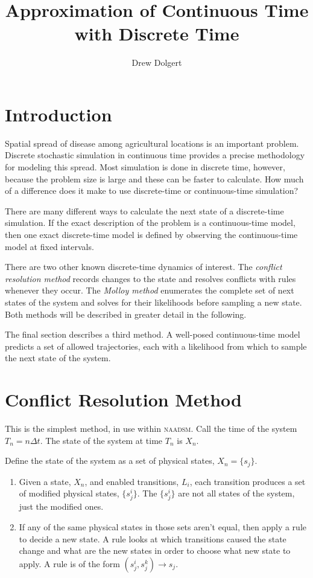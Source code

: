 \documentclass{article}
\title{Approximation of Continuous Time with Discrete Time}
\author{Drew Dolgert}
\begin{document}
\maketitle

\section{Introduction}
Spatial spread of disease among agricultural locations
is an important problem.
Discrete stochastic simulation in continuous time provides
a precise methodology for modeling this spread.
Most simulation is done in discrete time, however,
because the problem size is large and
these can be faster to calculate.
How much of a difference does it make to use discrete-time
or continuous-time simulation?

There are many different ways to calculate the next state of
a discrete-time simulation. If the exact description of the
problem is a continuous-time model, then one exact
discrete-time model is defined by observing the continuous-time
model at fixed intervals.

There are two other known discrete-time dynamics of interest.
The \emph{conflict resolution method} records changes
to the state and resolves conflicts with rules whenever they
occur. The \emph{Molloy method} enumerates the complete
set of next states of the system and solves for their
likelihoods before sampling a new state. Both
methods will be described in greater detail in the following.

The final section describes a third method.
A well-posed continuous-time model predicts a set of
allowed trajectories, each with a likelihood from
which to sample the next state of the system.

\section{Conflict Resolution Method}
This is the simplest method, in use within \textsc{naadsm}.
Call the time of the system $T_n=n\Delta t$. The state of
the system at time $T_n$ is $X_n$.

Define the state of the system as a set of physical
states, $X_n=\{s_j\}$.
\begin{enumerate}
\item Given a state, $X_n$, and enabled transitions, $L_i$,
each transition produces a set of modified physical states,
$\{s_j^i\}$. The $\{s_j^i\}$ are not all states of the
system, just the modified ones.
\item If any of the same physical states in those sets aren't
equal, then apply a rule to decide a new state.
A rule looks at which transitions caused the state
change and what are the new states in order to choose
what new state to apply.
A rule is of the form $(s_j^i, s_j^k)\rightarrow s_j$.
\end{enumerate}
\end{document}

